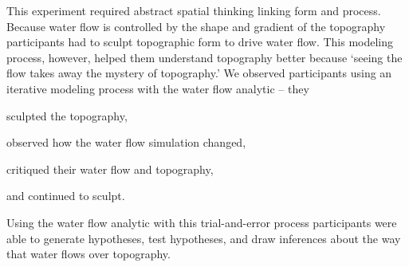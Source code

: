 \documentclass[prodmode,acmtochi]{acmsmall} %
\begin{document}
This experiment required abstract spatial thinking linking form and process. 
Because water flow is controlled by the shape and gradient of the topography
participants had to sculpt topographic form to drive water flow. 
This modeling process, however, helped them understand topography better 
because `seeing the flow takes away the mystery of topography.' 
%
We observed participants using an iterative modeling process 
with the water flow analytic -- 
they 
\begin{enumerate*}[label=\alph*),font=\itshape]
\item sculpted the topography, 
\item observed how the water flow simulation changed, 
\item critiqued their water flow and topography, 
\item and continued to sculpt.
\end{enumerate*}
%
Using the water flow analytic with this trial-and-error process
participants were able to generate hypotheses, test hypotheses, and draw inferences 
about the way that water flows over topography. 
%

\end{document}
